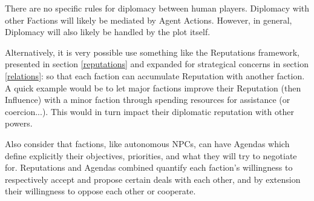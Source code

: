 There are no specific rules for diplomacy between human players. Diplomacy with other Factions will likely be mediated by Agent Actions. However, in general, Diplomacy will also likely be handled by the plot itself. 

Alternatively, it is very possible use something like the Reputations framework, presented in section \ref{reputations} and expanded for strategical concerns in section \ref{relations}: so that each faction can accumulate Reputation with another faction. A quick example would be to let major factions improve their Reputation (then Influence) with a minor faction through spending resources for assistance (or coercion...). This would in turn impact their diplomatic reputation with other powers.

Also consider that factions, like autonomous NPCs, can have Agendas which define explicitly their objectives, priorities, and what they will try to negotiate for. Reputations and Agendas combined quantify each faction's willingness to respectively accept and propose certain deals with each other, and by extension their willingness to oppose each other or cooperate.